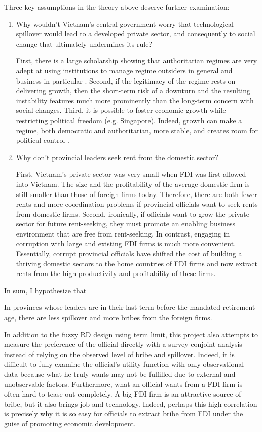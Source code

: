 Three key assumptions in the theory above deserve further examination:
\begin{enumerate}
\item Why wouldn't Vietnam's central government worry that technological spillover would lead to a developed private sector, and consequently to social change that ultimately undermines its rule?

First, there is a large scholarship showing that authoritarian regimes are very adept at using institutions to manage regime outsiders in general and business in particular \citep{Gandhi2006, Gandhi2008, Wright2008, Le2015}. Second, if the legitimacy of the regime rests on delivering growth, then the short-term risk of a downturn and the resulting instability features much more prominently than the long-term concern with social changes. Third, it is possible to foster economic growth while restricting political freedom (e.g. Singapore). Indeed, growth can make a regime, both democratic and authoritarian, more stable, and creates room for political control \citep{Przeworski1997}.

\item Why don't provincial leaders seek rent from the domestic sector? 

First, Vietnam's private sector was very small when FDI was first allowed into Vietnam. The size and the profitability of the average domestic firm is still smaller than those of foreign firms today. Therefore, there are both fewer rents and more coordination problems if provincial officials want to seek rents from domestic firms. Second, ironically, if officials want to grow the private sector for future rent-seeking, they must promote an enabling business environment that are free from rent-seeking. In contrast, engaging in corruption with large and existing FDI firms is much more convenient. Essentially, corrupt provincial officials have shifted the cost of building a thriving domestic sectors to the home countries of FDI firms and now extract rents from the high productivity and profitability of these firms. 
\end{enumerate}

In sum, I hypothesize that

\begin{hyp}
In provinces whose leaders are in their last term before the mandated retirement age, there are less spillover and more bribes from the foreign firms.
\end{hyp}

In addition to the fuzzy RD design using term limit, this project also attempts to measure the preference of the official directly with a survey conjoint analysis instead of relying on the observed level of bribe and spillover. Indeed, it is difficult to fully examine the official's utility function with only observational data because what he truly wants may not be fulfilled due to external and unobservable factors. Furthermore, what an official wants from a FDI firm is often hard to tease out completely. A big FDI firm is an attractive source of bribe, but it also brings job and technology. Indeed, perhaps this high correlation is precisely why it is so easy for officials to extract bribe from FDI under the guise of promoting economic development.

